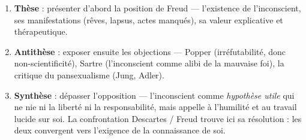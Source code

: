 \documentclass[11pt]{article}
\begin{document}
\begin{methode}
\begin{enumerate}
\item \textbf{Thèse} : présenter d'abord la position de Freud — l'existence de l'inconscient, ses manifestations (rêves, lapsus, actes manqués), sa valeur explicative et thérapeutique.
\item \textbf{Antithèse} : exposer ensuite les objections — Popper (irréfutabilité, donc non-scientificité), Sartre (l'inconscient comme alibi de la mauvaise foi), la critique du pansexualisme (Jung, Adler).
\item \textbf{Synthèse} : dépasser l'opposition — l'inconscient comme \emph{hypothèse utile} qui ne nie ni la liberté ni la responsabilité, mais appelle à l'humilité et au travail lucide sur soi. La confrontation Descartes / Freud trouve ici sa résolution : les deux convergent vers l'exigence de la connaissance de soi.
\end{enumerate}
\end{methode}
\end{document}

